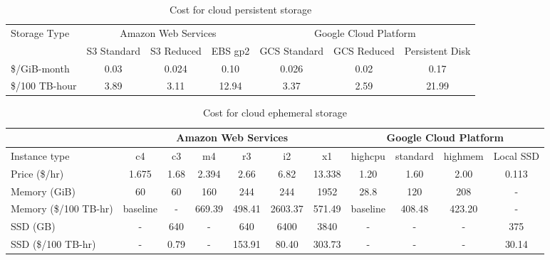 \documentclass{article}
\begin{document}
\begin{table}
  \begin{adjustwidth}{-1.5in}{-1.5in}  
    \centering
    \begin{tabular}{ | l | c | c | c | c | c | c | }
      \hline
      \multirow{2}{*}{Storage Type} & \multicolumn{3}{|c|}{Amazon Web Services} & \multicolumn{3}{|c|}{Google Cloud Platform} \\
      \cline{2-7}
      & S3 Standard & S3 Reduced & EBS gp2 & GCS Standard & GCS Reduced & Persistent Disk \\
      \hline
      \$/GiB-month & 0.03 & 0.024 & 0.10 & 0.026 & 0.02 & 0.17 \\
      \$/100 TB-hour & 3.89 & 3.11 & 12.94 & 3.37 & 2.59 & 21.99 \\
      \hline
    \end{tabular}
    \caption{Cost for cloud persistent storage}
    \label{table:persistentcost}
  \end{adjustwidth}
\end{table}

\begin{table}
  \begin{adjustwidth}{-1.5in}{-1.5in}  
    \centering
    \begin{tabular}{ | l | c | c | c | c | c | c | c | c | c | c | }
      \hline
      & \multicolumn{6}{|c|}{Amazon Web Services} & \multicolumn{4}{|c|}{Google Cloud Platform} \\
      \hline
      Instance type & c4 & c3 & m4 & r3 & i2 & x1 & highcpu & standard & highmem & Local SSD \\
      \hline
      Price (\$/hr) & 1.675 & 1.68 & 2.394 & 2.66 & 6.82 & 13.338 & 1.20 & 1.60 & 2.00 & 0.113 \\
      \hline
      Memory (GiB) & 60 & 60 & 160 & 244 & 244 & 1952 & 28.8 & 120 & 208 & - \\
      Memory (\$/100 TB-hr) & baseline & - & 669.39 & 498.41 & 2603.37 & 571.49 & baseline & 408.48 & 423.20 & - \\
      \hline
      SSD (GB) & - & 640 & - & 640 & 6400 & 3840 & - & - & - & 375 \\
      SSD (\$/100 TB-hr) & - & 0.79 & - & 153.91 & 80.40 & 303.73 & - & - & - & 30.14 \\
      \hline
    \end{tabular}
    \caption{Cost for cloud ephemeral storage}
    \label{table:ephemeralcost}
  \end{adjustwidth}
\end{table}
\end{document}

